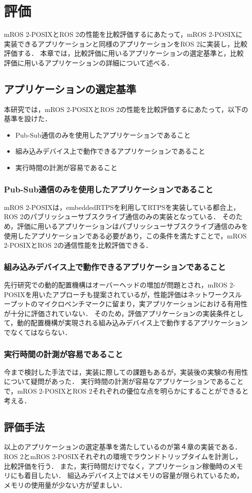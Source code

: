 \chapter{評価}
\label{chap:evaluation}
mROS 2-POSIXとROS 2の性能を比較評価するにあたって，mROS 2-POSIXに実装できるアプリケーションと同様のアプリケーションをROS 2に実装し，比較評価する．
本章では，比較評価に用いるアプリケーションの選定基準と，比較評価に用いるアプリケーションの詳細について述べる．
\section{アプリケーションの選定基準}
本研究では，mROS 2-POSIXとROS 2の性能を比較評価するにあたって，以下の基準を設けた．
\begin{itemize}
    \item Pub-Sub通信のみを使用したアプリケーションであること
    \item 組み込みデバイス上で動作できるアプリケーションであること
    \item 実行時間の計測が容易であること
\end{itemize}
\subsection{Pub-Sub通信のみを使用したアプリケーションであること}
mROS 2-POSIXは，embeddedRTPSを利用してRTPSを実装している都合上，ROS 2のパブリッシューサブスクライブ通信のみの実装となっている．
そのため，評価に用いるアプリケーションはパブリッシューサブスクライブ通信のみを使用したアプリケーションである必要があり，この条件を満たすことで，mROS 2-POSIXとROS 2の通信性能を比較評価できる．
\subsection{組み込みデバイス上で動作できるアプリケーションであること}
 先行研究での動的配置機構はオーバーヘッドの増加が問題とされ，mROS 2-POSIXを用いたアプローチも提案されているが，性能評価はネットワークスループットのマイクロベンチマークに留まり，実アプリケーションにおける有用性が十分に評価されていない．
 そのため，評価アプリケーションの実装条件として，動的配置機構が実現される組み込みデバイス上で動作するアプリケーションでなくてはならない．
\subsection{実行時間の計測が容易であること}
今まで検討した手法では，実装に際しての課題もあるが，実装後の実験の有用性について疑問があった．
実行時間の計測が容易なアプリケーションであることで，mROS 2-POSIXとROS 2それぞれの優位な点を明らかにすることができると考える．
\section{評価手法}
以上のアプリケーションの選定基準を満たしているのが第４章の実装である．
ROS 2とmROS 2-POSIXそれぞれの環境でラウンドトリップタイムを計測し，比較評価を行う．
また，実行時間だけでなく，アプリケーション稼働時のメモリにも着目したい．
組込みデバイス上ではメモリの容量が限られているため，メモリの使用量が少ない方が望ましい．
